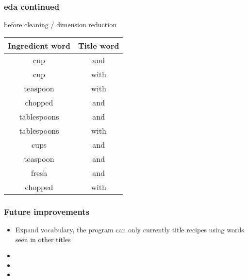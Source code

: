 \documentclass{beamer}
\begin{document}
\begin{frame}
	\frametitle{eda continued}
	before cleaning / dimension reduction
	\begin{center}
		\begin{tabular}{| c | c |}
			\hline
			Ingredient word & Title word \\
			\hline \hline
			cup & and \\
			cup & with \\
			teaspoon & with \\
			chopped & and \\
			tablespoons & and \\
			tablespoons & with \\
			cups & and \\
			teaspoon & and \\
			fresh & and \\
			chopped & with \\
			\hline

		\end{tabular}
	\end{center}
\end{frame}



\begin{frame}
	\frametitle{Future improvements}
	
	\begin{itemize}
		\item{Expand vocabulary, the program can only currently title
			recipes using words seen in other titles}
		\item{}
		\item{}
		\item{}
	\end{itemize}
\end{frame}
\end{document}
